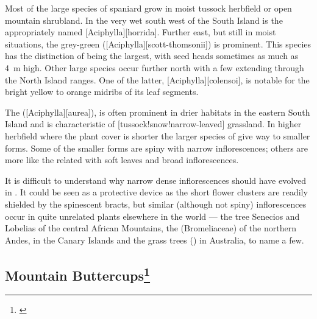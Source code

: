 Most of the large species of spaniard grow in moist tussock herbfield or open mountain shrubland.
In the very wet south west of the South Island is the appropriately named [Aciphylla][horrida].
Further east, but still in moist situations, the grey-green  ([Aciphylla][scott-thomsonii]) is prominent.
This species has the distinction of being the largest, with seed heads sometimes as much as \SI{4}{\metre} high.
Other large species occur further north with a few extending through the North Island ranges.
One of the latter, [Aciphylla][colensoi], is notable for the bright yellow to orange midribs of its leaf segments.

The  ([Aciphylla][aurea]), is often prominent in drier habitats in the eastern South Island and is characteristic of [tussock!snow!narrow-leaved] grassland.
In higher herbfield where the plant cover is shorter the larger species of  give way to smaller forms.
Some of the smaller forms are spiny with narrow inflorescences; others are more like the related  with soft leaves and broad inflorescences.

It is difficult to understand why narrow dense inflorescences should have evolved in .
It could be seen as a protective device as the short flower clusters are readily shielded by the spinescent bracts, but similar (although not spiny) inflorescences occur in quite unrelated plants elsewhere in the world --- the tree Senecios and Lobelias of the central African Mountains, the  (Bromeliaceae) of the northern Andes,  in the Canary Islands and the grass trees () in Australia, to name a few.

\subsection[Mountain Buttercups]{Mountain Buttercups\thinspace\footnote{\cite{fisher1965alpine}}}

